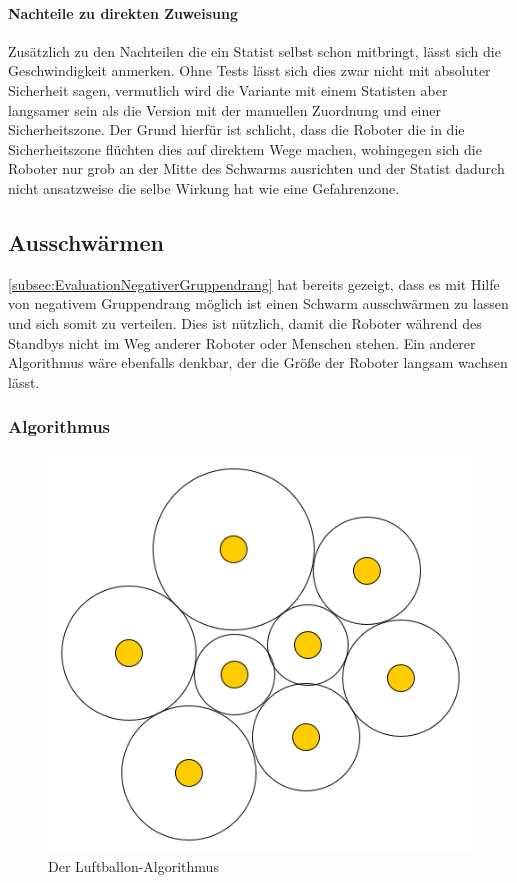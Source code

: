 \paragraph*{Nachteile zu direkten Zuweisung}
Zusätzlich zu den Nachteilen die ein Statist selbst schon mitbringt, lässt sich die Geschwindigkeit anmerken. Ohne Tests lässt sich dies zwar nicht mit absoluter Sicherheit sagen, vermutlich wird die Variante mit einem Statisten aber langsamer sein als die Version mit der manuellen Zuordnung und einer Sicherheitszone. Der Grund hierfür ist schlicht, dass die Roboter die in die Sicherheitszone flüchten dies auf direktem Wege machen, wohingegen sich die Roboter nur grob an der Mitte des Schwarms ausrichten und der Statist dadurch nicht ansatzweise die selbe Wirkung hat wie eine Gefahrenzone.

\subsection{Ausschwärmen}

\autoref{subsec:EvaluationNegativerGruppendrang} hat bereits gezeigt, dass es mit Hilfe von negativem Gruppendrang möglich ist einen Schwarm ausschwärmen zu lassen und sich somit zu verteilen. Dies ist nützlich, damit die Roboter während des Standbys nicht im Weg anderer Roboter oder Menschen stehen.
Ein anderer Algorithmus wäre ebenfalls denkbar, der die Größe der Roboter langsam wachsen lässt.

\subsubsection*{Algorithmus}

\begin{figure}
	\includegraphics[width=\pictureWidthSmall,keepaspectratio]{graphics/LuftballonAlgorithmus.png}
	\caption{Der Luftballon-Algorithmus}
	\label{pic:Luftballon}
\end{figure}


